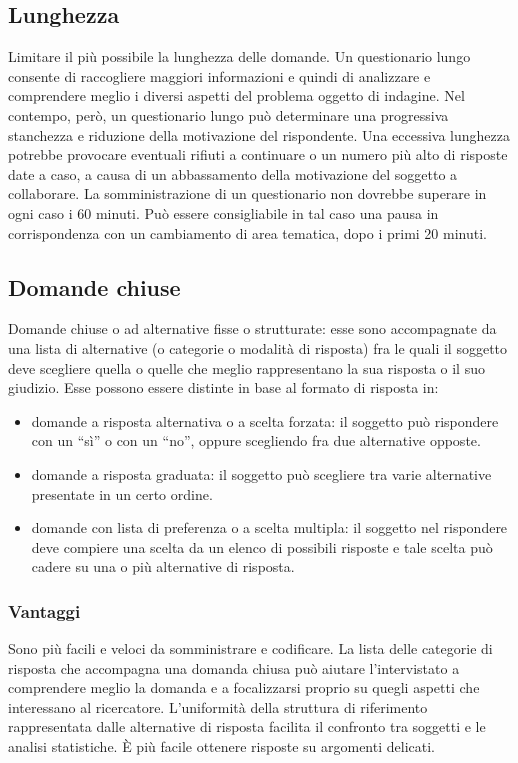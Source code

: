 \subsection{Lunghezza}
Limitare il più possibile la lunghezza delle domande. Un questionario lungo consente di raccogliere maggiori informazioni e quindi di analizzare e comprendere meglio i diversi aspetti del problema oggetto di indagine. Nel contempo, però, un questionario lungo può determinare una progressiva stanchezza e riduzione della motivazione del rispondente. \newline
Una eccessiva lunghezza potrebbe provocare eventuali rifiuti a continuare o un numero più alto di risposte date a caso, a causa
di un abbassamento della motivazione del soggetto a collaborare. La somministrazione di un questionario non dovrebbe superare in ogni caso i 60 minuti. \newline
Può essere consigliabile in tal caso una pausa in corrispondenza con un cambiamento di area tematica, dopo i primi 20 minuti.

\subsection{Domande chiuse}
Domande chiuse o ad alternative fisse o strutturate: esse sono accompagnate da una lista di alternative (o categorie o modalità di risposta) fra le quali il soggetto deve scegliere quella o quelle che meglio rappresentano la sua risposta o il suo giudizio. \newline
Esse possono essere distinte in base al formato di risposta in:
\begin{itemize}
	\item domande a risposta alternativa o a scelta forzata: il soggetto può rispondere con un “sì” o con un “no”, oppure scegliendo fra due alternative opposte.
	\item domande a risposta graduata: il soggetto può scegliere tra varie alternative presentate in un certo ordine.
	\item domande con lista di preferenza o a scelta multipla: il soggetto nel rispondere deve compiere una scelta da un elenco di possibili risposte e tale scelta può cadere su una o più alternative di risposta.
\end{itemize}

\subsubsection{Vantaggi}
Sono più facili e veloci da somministrare e codificare. La lista delle categorie di risposta che accompagna una domanda chiusa può aiutare l’intervistato a comprendere meglio la domanda e a focalizzarsi proprio su quegli aspetti che interessano al ricercatore. L’uniformità della struttura di riferimento rappresentata dalle alternative di risposta facilita il confronto tra soggetti e le analisi statistiche. È più facile ottenere risposte su argomenti delicati.

